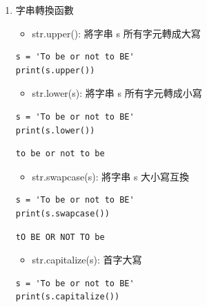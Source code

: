 \documentclass[a4paper,12pt]{article}
\begin{document}
\begin{enumerate}
\item 字串轉換函數
\label{sec:orgdf67773}
\begin{itemize}
\item str.upper(): 將字串 s 所有字元轉成大寫\\
\end{itemize}
\lstset{breaklines=true,language=Python,label= ,caption= ,captionpos=b,firstnumber=1,numbers=left}
\begin{lstlisting}
s = 'To be or not to BE'
print(s.upper())
\end{lstlisting}

\begin{itemize}
\item str.lower(s): 將字串 s 所有字元轉成小寫\\
\end{itemize}
\lstset{breaklines=true,language=Python,label= ,caption= ,captionpos=b,firstnumber=1,numbers=left}
\begin{lstlisting}
s = 'To be or not to BE'
print(s.lower())
\end{lstlisting}

\begin{verbatim}
to be or not to be
\end{verbatim}


\begin{itemize}
\item str.swapcase(s): 將字串 s 大小寫互換\\
\end{itemize}
\lstset{breaklines=true,language=Python,label= ,caption= ,captionpos=b,firstnumber=1,numbers=left}
\begin{lstlisting}
s = 'To be or not to BE'
print(s.swapcase())
\end{lstlisting}

\begin{verbatim}
tO BE OR NOT TO be
\end{verbatim}


\begin{itemize}
\item str.capitalize(s): 首字大寫\\
\end{itemize}
\lstset{breaklines=true,language=Python,label= ,caption= ,captionpos=b,firstnumber=1,numbers=left}
\begin{lstlisting}
s = 'To be or not to BE'
print(s.capitalize())
\end{lstlisting}


\end{enumerate}
\end{document}
